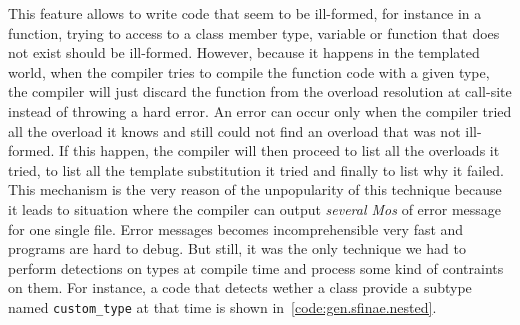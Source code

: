 This feature allows to write code that seem to be ill-formed, for instance in a function, trying to access to a class
member type, variable or function that does not exist should be ill-formed. However, because it happens in the templated
world, when the compiler tries to compile the function code with a given type, the compiler will just discard the
function from the overload resolution at call-site instead of throwing a hard error. An error can occur only when the
compiler tried all the overload it knows and still could not find an overload that was not ill-formed. If this happen,
the compiler will then proceed to list all the overloads it tried, to list all the template substitution it tried and
finally to list why it failed. This mechanism is the very reason of the unpopularity of this technique because it leads
to situation where the compiler can output \emph{several Mos} of error message for one single file. Error messages
becomes incomprehensible very fast and programs are hard to debug. But still, it was the only technique we had to
perform detections on types at compile time and process some kind of contraints on them. For instance, a code that
detects wether a class provide a subtype named \texttt{custom\_type} at that time is shown
in~\cref{code:gen.sfinae.nested}.

